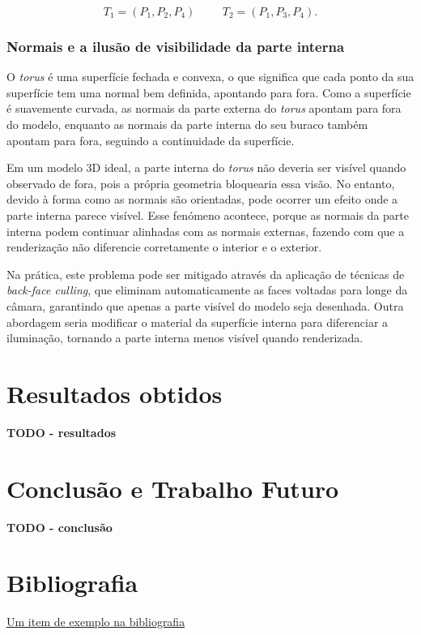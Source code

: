\documentclass[12pt, a4paper]{article}
\begin{document}
$$
T_1 = (P_1, P_2, P_4)
\hspace{1cm}
T_2 = (P_1, P_3, P_4).
$$

\subsubsection{Normais e a ilusão de visibilidade da parte interna}

O \emph{torus} é uma superfície fechada e convexa, o que significa que cada ponto da sua superfície
tem uma normal bem definida, apontando para fora. Como a superfície é suavemente curvada, as
normais da parte externa do \emph{torus} apontam para fora do modelo, enquanto as normais da parte
interna do seu buraco também apontam para fora, seguindo a continuidade da superfície.

Em um modelo 3D ideal, a parte interna do \emph{torus} não deveria ser visível quando observado de
fora, pois a própria geometria bloquearia essa visão. No entanto, devido à forma como as normais
são orientadas, pode ocorrer um efeito onde a parte interna parece visível. Esse fenómeno acontece,
porque as normais da parte interna podem continuar alinhadas com as normais externas, fazendo com
que a renderização não diferencie corretamente o interior e o exterior.

Na prática, este problema pode ser mitigado através da aplicação de técnicas de
\emph{back-face culling}, que eliminam automaticamente as faces voltadas para longe da câmara,
garantindo que apenas a parte visível do modelo seja desenhada. Outra abordagem seria modificar o
material da superfície interna para diferenciar a iluminação, tornando a parte interna menos
visível quando renderizada.

\section{Resultados obtidos}

\textbf{\color{red} TODO - resultados}

\section{Conclusão e Trabalho Futuro}

\textbf{\color{red} TODO - conclusão}

\begingroup
\section{Bibliografia}
\renewcommand{\section}[2]{}

\begin{thebibliography}{9}
        \href{https://youtu.be/dQw4w9WgXcQ}{Um item de exemplo na bibliografia}
\end{thebibliography}
\endgroup
\end{document}
